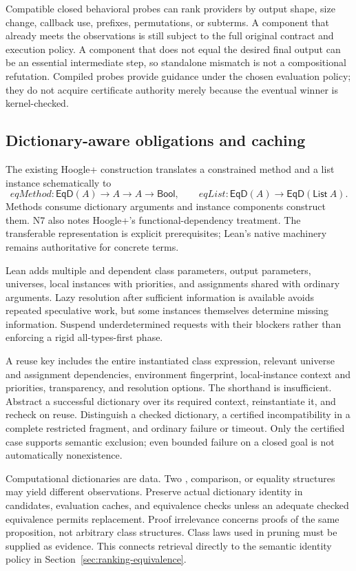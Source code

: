 Compatible closed behavioral probes can rank providers by output shape, size change, callback use, prefixes, permutations, or subterms. A component that already meets the observations is still subject to the full original contract and execution policy. A component that does not equal the desired final output can be an essential intermediate step, so standalone mismatch is not a compositional refutation. Compiled probes provide guidance under the chosen evaluation policy; they do not acquire certificate authority merely because the eventual winner is kernel-checked.

\subsection{Dictionary-aware obligations and caching}\label{sec:retrieval-dictionaries}

The existing Hoogle+ construction translates a constrained method and a list instance schematically to
\[
 \mathit{eqMethod}:\mathsf{EqD}(A)\to A\to A\to\mathsf{Bool},
 \qquad
 \mathit{eqList}:\mathsf{EqD}(A)\to\mathsf{EqD}(\mathsf{List}\ A).
\]
Methods consume dictionary arguments and instance components construct them. N7 also notes Hoogle+'s functional-dependency treatment. The transferable representation is explicit prerequisites; Lean's native machinery remains authoritative for concrete terms.

Lean adds multiple and dependent class parameters, output parameters, universes, local instances with priorities, and assignments shared with ordinary arguments. Lazy resolution after sufficient information is available avoids repeated speculative work, but some instances themselves determine missing information. Suspend underdetermined requests with their blockers rather than enforcing a rigid all-types-first phase.

A reuse key includes the entire instantiated class expression, relevant universe and assignment dependencies, environment fingerprint, local-instance context and priorities, transparency, and resolution options. The shorthand  is insufficient. Abstract a successful dictionary over its required context, reinstantiate it, and recheck on reuse. Distinguish a checked dictionary, a certified incompatibility in a complete restricted fragment, and ordinary failure or timeout. Only the certified case supports semantic exclusion; even bounded failure on a closed goal is not automatically nonexistence.

Computational dictionaries are data. Two , comparison, or equality structures may yield different observations. Preserve actual dictionary identity in candidates, evaluation caches, and equivalence checks unless an adequate checked equivalence permits replacement. Proof irrelevance concerns proofs of the same proposition, not arbitrary class structures. Class laws used in pruning must be supplied as evidence. This connects retrieval directly to the semantic identity policy in Section~\ref{sec:ranking-equivalence}.

